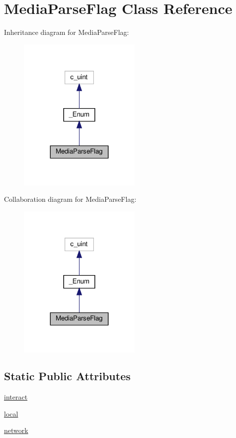 \hypertarget{classvlc_1_1_media_parse_flag}{}\section{Media\+Parse\+Flag Class Reference}
\label{classvlc_1_1_media_parse_flag}


Inheritance diagram for Media\+Parse\+Flag\+:
\nopagebreak
\begin{figure}[H]
\begin{center}
\leavevmode
\includegraphics[width=167pt]{classvlc_1_1_media_parse_flag__inherit__graph}
\end{center}
\end{figure}


Collaboration diagram for Media\+Parse\+Flag\+:
\nopagebreak
\begin{figure}[H]
\begin{center}
\leavevmode
\includegraphics[width=167pt]{classvlc_1_1_media_parse_flag__coll__graph}
\end{center}
\end{figure}
\subsection*{Static Public Attributes}
\begin{DoxyCompactItemize}
\item 
\hyperlink{classvlc_1_1_media_parse_flag_a3f082c25d75474761ff2a232ff933552}{interact}
\item 
\hyperlink{classvlc_1_1_media_parse_flag_a96db3da3652c2ce91fd6b07f397ab3f5}{local}
\item 
\hyperlink{classvlc_1_1_media_parse_flag_a6b288a470bcb2fd5f321915ef4045b8b}{network}
\end{DoxyCompactItemize}
